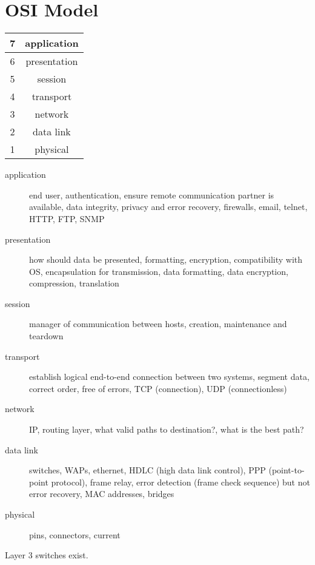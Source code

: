 \documentclass{article}
\begin{document}
\section{OSI Model}

\begin{tabular}{ | c | c | }
\hline
7 & application \\ \hline
6 & presentation \\ \hline
5 & session \\ \hline
4 & transport \\ \hline
3 & network \\ \hline
2 & data link \\ \hline
1 & physical \\ \hline
\end{tabular}

\begin{description}

\item[application]
end user, authentication, ensure remote communication partner is available,
data integrity, privacy and error recovery, firewalls, email, telnet, HTTP,
FTP, SNMP

\item[presentation]
how should data be presented, formatting, encryption, compatibility with OS,
encapsulation for transmission, data formatting, data encryption, compression,
translation

\item[session]
manager of communication between hosts, creation, maintenance and teardown

\item[transport]
establish logical end-to-end connection between two systems, segment data,
correct order, free of errors, TCP (connection), UDP (connectionless)

\item[network]
IP, routing layer, what valid paths to destination?, what is the best path?

\item[data link]
switches, WAPs, ethernet, HDLC (high data link control), PPP (point-to-point
protocol), frame relay, error detection (frame check sequence) but not error
recovery, MAC addresses, bridges

\item[physical]
pins, connectors, current

\end{description}

Layer 3 switches exist.\\
\end{document}
